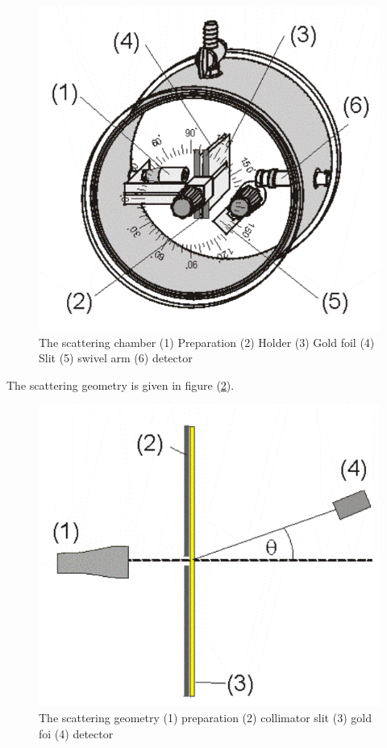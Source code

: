 \documentclass[%
 reprint,
nofootinbib,
 amsmath,amssymb,
 aps,
floatfix,
]{revtex4-2}
\begin{document}
    \begin{figure}
        \centering
        \includegraphics[scale = 0.6]{Figures/chamber.png}
        \caption{The scattering chamber (1) Preparation (2) Holder (3) Gold foil (4) Slit (5) swivel arm (6) detector}
        \label{fig:chamber}
    \end{figure}
    The scattering geometry is given in figure (\ref{fig:geometry}).
    \begin{figure}
        \centering
        \includegraphics[scale = 0.6]{Figures/geometry.png}
        \caption{The scattering geometry (1) preparation (2) collimator slit (3) gold foi (4) detector}
        \label{fig:geometry}
    \end{figure}
    
\end{document}
